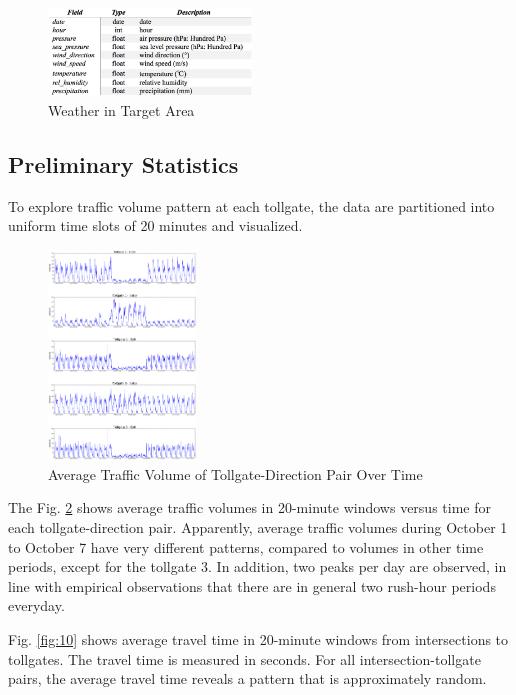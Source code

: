 \documentclass[journal, letterpaper]{IEEEtran}
\begin{document}
\begin{figure} [H]
  \centering
  \includegraphics[width=0.48\textwidth]{weather.png}
  \caption{Weather in Target Area}
  \label{fig:8}
\end{figure}

\subsection{Preliminary Statistics}
To explore traffic volume pattern at each tollgate, the data are partitioned into uniform time slots of 20 minutes and visualized. 

\begin{figure} [H]
  \centering
  \includegraphics[width=0.35\textwidth]{tollgate-volume-3.png}
  \caption{Average Traffic Volume of Tollgate-Direction Pair Over Time}
  \captionsetup{justification=centering}
  \label{fig:9}
\end{figure} 

The Fig. \ref{fig:9} shows average traffic volumes in 20-minute windows versus time for each tollgate-direction pair. Apparently, average traffic volumes during October 1 to October 7 have very different patterns, compared to volumes in other time periods, except for the tollgate 3. In addition, two peaks per day are observed, in line with empirical observations that there are in general two rush-hour periods everyday.         

Fig. \ref{fig:10} shows average travel time in 20-minute windows from intersections to tollgates. The travel time is measured in seconds. For all intersection-tollgate pairs, the average travel time reveals a pattern that is approximately random. 
\end{document}
